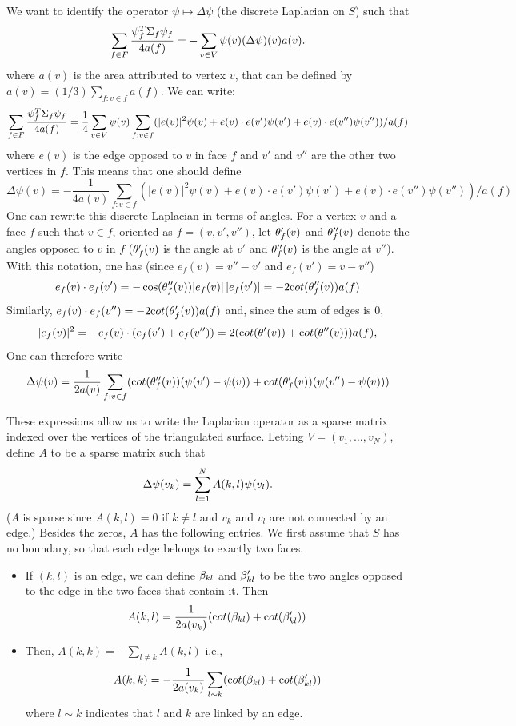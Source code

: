 \documentclass{InsightArticle}
\begin{document}
We want to identify the operator $\psi \mapsto \Delta\psi$ (the
discrete Laplacian on $S$) such that 
\[
\sum_{f\in F} \frac{\psi_f^T\Sigma_f\psi_f}{4a(f)} = - \sum_{v\in V} \psi(v) (\Delta\psi)(v)
a(v).
\] 
where $a(v)$ is the area attributed to vertex $v$, that can be defined
by $a(v) = (1/3) \sum_{f:v\in f} a(f)$. We can write: 
$$
\sum_{f\in F} \frac{\psi_f^T\Sigma_f\psi_f}{4a(f)} = \frac14\sum_{v\in V}\psi(v) \sum_{f: v\in f} (|e(v)|^2 \psi(v) + e(v)\cdot e({v'})
\psi(v') + e(v)\cdot e(v'')
\psi(v'') ) / a(f)
$$
where $e(v)$ is the edge opposed to $v$ in face $f$ and $v'$ and $v''$ are
the other two vertices in $f$. This means that one should define
\[
\Delta \psi(v) = - \frac1{4a(v)}\sum_{f: v\in f} (|e(v)|^2 \psi(v) + e(v)\cdot e({v'})
\psi(v') + e(v)\cdot e(v'')
\psi(v'') ) / a(f)
\]
One can rewrite this discrete Laplacian in terms of angles. For a
vertex $v$ and a face $f$ such that $v\in f$, oriented as $f =
(v,v',v'')$, let $\theta'_f(v)$ and
$\theta''_f(v)$ denote the angles opposed to $v$ in $f$ ($\theta'_f(v)$ is
the angle at $v'$ and $\theta''_f(v)$ is
the angle at $v''$). With this
notation, one has (since $e_f(v) = v'' - v'$ and $e_f(v') = v - v''$)
\[
e_f(v)\cdot e_f(v') = - \cos(\theta''_f(v)) |e_f(v)|\,|e_f(v')| = - 2{\mathrm cot}(\theta''_f(v)) a(f)
\]
Similarly, $e_f(v)\cdot e_f(v'') =  - 2{\mathrm cot}(\theta'_f(v)) a(f)$ and,
since the sum of edges is 0, 
\[
|e_f(v)|^2 = - e_f(v) \cdot (e_f(v') + e_f(v'')) = 2({\mathrm
  cot}(\theta'(v)) + {\mathrm cot}(\theta''(v))) a(f),
\]
One can therefore write
\[
\Delta \psi(v) =  \frac1{2a(v)}\sum_{f: v\in f} ({\mathrm cot}(\theta''_f(v))
(\psi(v') - \psi(v)) + {\mathrm cot}(\theta_f'(v))
(\psi(v'') - \psi(v)))
\]


These expressions allow us to write the Laplacian operator as a
sparse matrix indexed over the vertices of the triangulated
surface. Letting $V = (v_1, \ldots, v_N)$, define $A$ to be a sparse
matrix such that 
\[
\Delta \psi(v_k) = \sum_{l=1}^N A(k,l) \psi(v_l).
\]
($A$ is sparse since  $A(k,l) = 0$ if $k\neq l$ and $v_k$ and $v_l$ are not connected by
an edge.)
Besides the zeros, $A$ has the following entries. We first assume that
$S$ has no boundary, so that each edge belongs to exactly two faces. 
\begin{itemize}
\item If $(k,l)$ is an edge, we can define $\beta_{kl}$ and
  $\beta_{kl}'$ to be the two angles opposed to the edge in the two faces that
  contain it. Then 
\[
A(k,l) =  \frac1{2a(v_k)}  ({\mathrm cot}(\beta_{kl}) +
{\mathrm cot}(\beta_{kl}'))
\]
\item Then, $A(k,k) = - \sum_{l\neq k} A(k,l)$ i.e., 
\[
A(k,k) = - \frac{1}{2a(v_k)} \sum_{l \sim k}  ({\mathrm cot}(\beta_{kl}) +
{\mathrm cot}(\beta_{kl}'))
\]
where $l\sim k$ indicates that $l$ and $k$ are linked by an edge.
\end{itemize}
\end{document}
